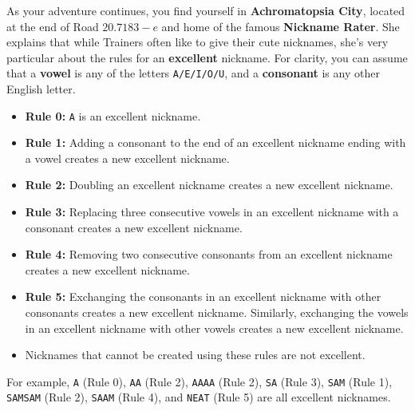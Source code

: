

As your adventure continues, you find yourself in
\textbf{Achromatopsia City}, located at the end of Road \(20.7183-e\)
and home of the famous \mappMobidash{} \textbf{Nickname Rater}.
She explains that while Trainers often like to give their
\mappMobidot{} cute nicknames, she's very particular about the rules
for an \textbf{excellent} \mappMobidash{} nickname.
For clarity, you can assume
that a \textbf{vowel} is any of the letters \texttt{A/E/I/O/U}, and a
\textbf{consonant} is any other English letter.

\begin{multicols}{2}
\begin{itemize}
  \item \textbf{Rule 0:}
        \texttt{A} is an excellent nickname.
  \item \textbf{Rule 1:}
        Adding a consonant to the end of an excellent nickname ending with
        a vowel creates a new excellent nickname.
  \item \textbf{Rule 2:}
        Doubling an excellent nickname creates a new excellent nickname.
  \item \textbf{Rule 3:}
        Replacing three consecutive vowels in an excellent nickname with
        a consonant creates a new excellent nickname.
  \item \textbf{Rule 4:}
        Removing two consecutive consonants from an excellent nickname
        creates a new excellent nickname.
  \item \textbf{Rule 5:}
        Exchanging the consonants in an excellent nickname with other
        consonants creates a new excellent nickname. Similarly,
        exchanging the vowels in an excellent nickname with other vowels
        creates a new excellent nickname.
  \item Nicknames that cannot be created using these rules are not
        excellent.
\end{itemize}
\end{multicols}

For example, \texttt{A} (Rule 0), \texttt{AA} (Rule 2), \texttt{AAAA} (Rule 2),
\texttt{SA} (Rule 3), \texttt{SAM} (Rule 1), \texttt{SAMSAM} (Rule 2),
\texttt{SAAM} (Rule 4), and \texttt{NEAT} (Rule 5) are all excellent nicknames.

